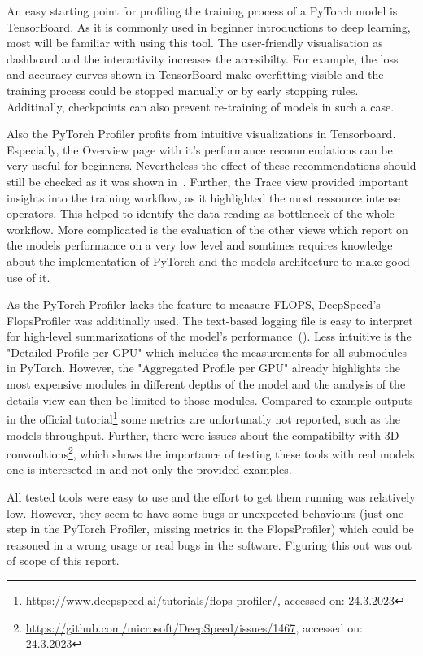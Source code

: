 \documentclass[12pt, a4paper, hidelinks]{article}
\begin{document}
An easy starting point for profiling the training process of a PyTorch model is TensorBoard. As it is commonly used in beginner introductions to deep learning, most will be familiar with using this tool. The user-friendly visualisation as dashboard and the interactivity increases the accesibilty.
For example, the loss and accuracy curves shown in TensorBoard make overfitting visible and the training process could be stopped manually or by early stopping rules. Additinally, checkpoints can also prevent re-training of models in such a case.

Also the PyTorch Profiler profits from intuitive visualizations in Tensorboard.
Especially, the Overview page with it's performance recommendations can be very useful for beginners. Nevertheless the effect of these recommendations should still be checked as it was shown in~.
Further, the Trace view provided important insights into the training workflow, as it highlighted the most ressource intense operators. This helped to identify the data reading as bottleneck of the whole workflow.
More complicated is the evaluation of the other views which report on the models performance on a very low level and somtimes requires knowledge about the implementation of PyTorch and the models architecture to make good use of it. 

As the PyTorch Profiler lacks the feature to measure \ac{FLOPS}, DeepSpeed's FlopsProfiler was additinally used. The text-based logging file is easy to interpret for high-level summarizations of the model's performance~(). Less intuitive is the "Detailed Profile per GPU" which includes the measurements for all submodules in PyTorch. However, the "Aggregated Profile per GPU" already highlights the most expensive modules in different depths of the model and the analysis of the details view can then be limited to those modules.
Compared to example outputs in the official tutorial\footnote{\url{https://www.deepspeed.ai/tutorials/flops-profiler/}, accessed on: 24.3.2023} some metrics are unfortunatly not reported, such as the models throughput. Further, there were issues about the compatibilty with 3D convoultions\footnote{\url{https://github.com/microsoft/DeepSpeed/issues/1467}, accessed on: 24.3.2023}, which shows the importance of testing these tools with real models one is intereseted in and not only the provided examples.

All tested tools were easy to use and the effort to get them running was relatively low. However, they seem to have some bugs or unexpected behaviours (just one step in the PyTorch Profiler, missing metrics in the FlopsProfiler) which could be reasoned in a wrong usage or real bugs in the software. Figuring this out was out of scope of this report.
\iffalse
\end{document}
